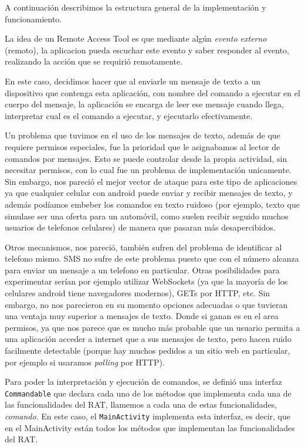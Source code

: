 A continuación describimos la estructura general de la implementación y funcionamiento.

La idea de un Remote Access Tool es que mediante algún \emph{evento externo} (remoto), la aplicacion pueda escuchar este evento y saber responder al evento, realizando la acción que se requirió remotamente. 

En este caso, decidimos hacer que al enviarle un mensaje de texto a un dispositivo que contenga esta aplicación, con nombre del comando a ejecutar en el cuerpo del mensaje, la aplicación se encarga de leer ese mensaje cuando llega, interpretar cual es el comando a ejecutar, y ejecutarlo efectivamente.

Un problema que tuvimos en el uso de los mensajes de texto, además de que requiere permisos especiales, fue la prioridad que le asignabamos al
lector de comandos por mensajes. Esto se puede controlar desde la propia actividad, sin necesitar permisos, con lo cual fue un problema de implementación unicamente. Sin embargo, nos pareció el mejor vector de ataque para este tipo de aplicaciones ya que cualquier celular con
android puede enviar y recibir mensajes de texto, y además podíamos embeber los comandos en texto ruidoso (por ejemplo, texto que simulase ser
una oferta para un automóvil, como suelen recibir seguido muchos usuarios de telefonos celulares) de manera que pasaran más desapercibidos.

Otros mecanismos, nos pareció, también sufren del problema de identificar al telefono mismo. SMS no sufre de este problema puesto que con
el número alcanza para enviar un mensaje a un telefono en particular. Otras posibilidades para experimentar serían por ejemplo utilizar WebSockets (ya que la mayoría de los celulares android tiene navegadores modernos), GETs por HTTP, etc. Sin embargo, no nos parecieron en su momento opciones adecuadas o que tuvieran una ventaja muy superior a mensajes de texto. Donde si ganan es en el area permisos, ya que nos parece que es mucho más probable que un usuario permita a una aplicación acceder a internet que a sus mensajes de texto, pero hacen ruido facilmente detectable (porque hay muchos pedidos a un sitio web en particular, por ejemplo si usaramos \textit{polling} por HTTP).

Para poder la interpretación y ejecución de comandos, se definió una interfaz {\tt Commandable} que declara cada uno de los métodos que implementa cada una de las funcionalidades del RAT, llamemos a cada una de estas funcionalidades, \emph{comando}. En este caso, el {\tt MainActivity} implementa esta interfaz, es decir, que en el MainActivity están todos los métodos que implementan las funcionalidades del RAT.


